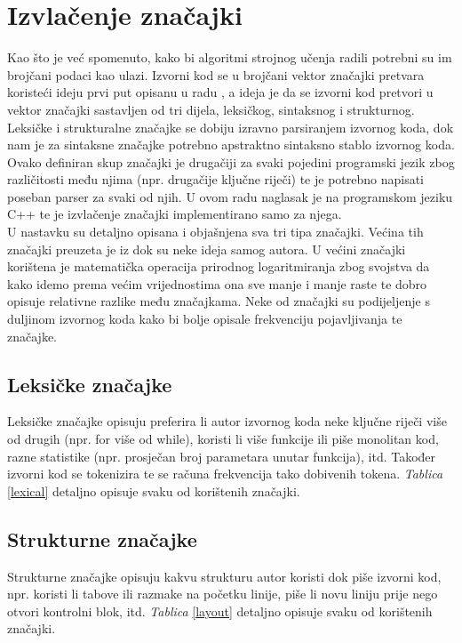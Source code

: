 \section{Izvlačenje značajki} \label{sec:fe}
Kao što je već spomenuto, kako bi algoritmi strojnog učenja radili potrebni su im brojčani podaci kao ulazi. Izvorni kod se u brojčani vektor značajki pretvara koristeći ideju prvi put opisanu u radu \cite{islam}, a ideja je da se izvorni kod pretvori u vektor značajki sastavljen od tri dijela, leksičkog, sintaksnog i strukturnog. Leksičke i strukturalne značajke se dobiju izravno parsiranjem izvornog koda, dok nam je za sintaksne značajke potrebno apstraktno sintaksno stablo izvornog koda. Ovako definiran skup značajki je drugačiji za svaki pojedini programski jezik zbog različitosti među njima (npr. drugačije ključne riječi) te je potrebno napisati poseban parser za svaki od njih. U ovom radu naglasak je na programskom jeziku C++ te je izvlačenje značajki implementirano samo za njega. \\

	U nastavku su detaljno opisana i objašnjena sva tri tipa značajki. Većina tih značajki preuzeta je iz \cite{islam} dok su neke ideja samog autora. U većini značajki korištena je matematička operacija prirodnog logaritmiranja zbog svojstva da kako idemo prema većim vrijednostima ona sve manje i manje raste te dobro opisuje relativne razlike među značajkama. Neke od značajki su podijeljenje s duljinom izvornog koda kako bi bolje opisale frekvenciju pojavljivanja te značajke. 

\subsection{Leksičke značajke}
Leksičke značajke opisuju preferira li autor izvornog koda neke ključne riječi više od drugih (npr. for više od while), koristi li više funkcije ili piše monolitan kod, razne statistike (npr. prosječan broj parametara unutar funkcija), itd. Također izvorni kod se tokenizira te se računa frekvencija tako dobivenih tokena. \textit{Tablica} \ref{lexical} detaljno opisuje svaku od korištenih značajki. 

\subsection{Strukturne značajke}
Strukturne značajke opisuju kakvu strukturu autor koristi dok piše izvorni kod, npr. koristi li tabove ili razmake na početku linije, piše li novu liniju prije nego otvori kontrolni blok, itd. \textit{Tablica} \ref{layout} detaljno opisuje svaku od korištenih značajki.

